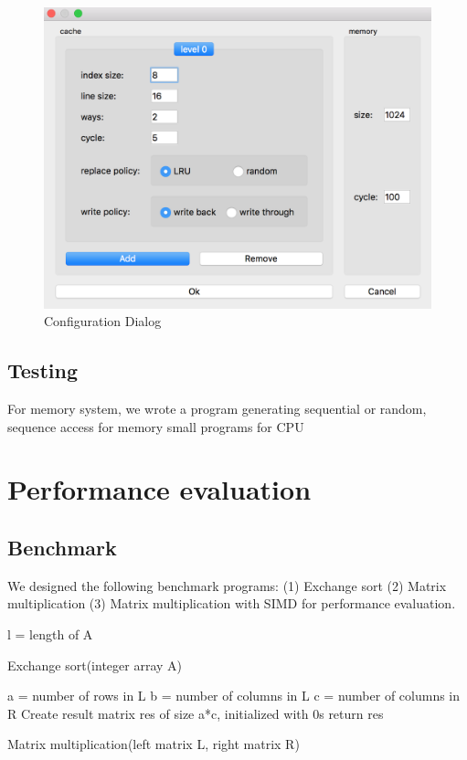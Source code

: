 \documentclass{sig-alternate}
\begin{document}
\begin{figure}
\centering
\includegraphics[width = 0.8\linewidth,keepaspectratio]{config}
\caption{Configuration Dialog}
\label{fig:conf}
\end{figure}

\subsection{Testing} 
For memory system, we wrote a program generating sequential or 
random, sequence access for memory
small programs for CPU

\section{Performance evaluation}
\subsection{Benchmark}
We designed the following benchmark programs: (1) Exchange sort (2) Matrix multiplication (3) Matrix multiplication with SIMD for performance evaluation. 

\begin{algorithm}[]
\SetAlgoLined
 l = length of A\;
 \caption{Exchange sort(integer array A)}
\end{algorithm}

\begin{algorithm}[]
\SetAlgoLined
 a = number of rows in L\;
 b = number of columns in L\;
 c = number of columns in R\;
 Create result matrix res of size a*c, initialized with 0s\;
 return res\;
 \caption{Matrix multiplication(left matrix L, right matrix R)}
\end{algorithm}
\end{document}
